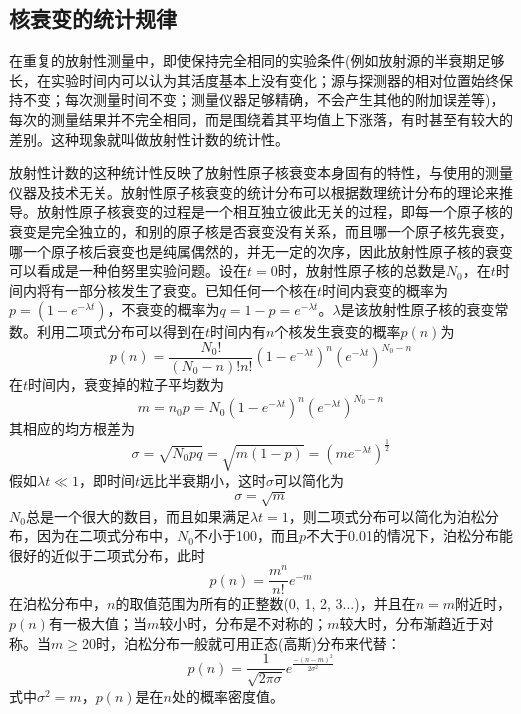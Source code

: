 \documentclass[a4paper]{article}
\begin{document}
\subsection{核衰变的统计规律}
在重复的放射性测量中，即使保持完全相同的实验条件(例如放射源的半衰期足够长，在实验时间内可以认为其活度基本上没有变化；源与探测器的相对位置始终保持不变；每次测量时间不变；测量仪器足够精确，不会产生其他的附加误差等)，每次的测量结果并不完全相同，而是围绕着其平均值上下涨落，有时甚至有较大的差别。这种现象就叫做放射性计数的统计性。

放射性计数的这种统计性反映了放射性原子核衰变本身固有的特性，与使用的测量仪器及技术无关。放射性原子核衰变的统计分布可以根据数理统计分布的理论来推导。放射性原子核衰变的过程是一个相互独立彼此无关的过程，即每一个原子核的衰变是完全独立的，和别的原子核是否衰变没有关系，而且哪一个原子核先衰变，哪一个原子核后衰变也是纯属偶然的，并无一定的次序，因此放射性原子核的衰变可以看成是一种伯努里实验问题。设在$t=0$时，放射性原子核的总数是$N_0$，在$t$时间内将有一部分核发生了衰变。已知任何一个核在$t$时间内衰变的概率为$p = (1-e^{-\lambda t})$，不衰变的概率为$q = 1 - p = e^{-\lambda t}$。$\lambda$是该放射性原子核的衰变常数。利用二项式分布可以得到在$t$时间内有$n$个核发生衰变的概率$p(n)$为
\begin{equation}
	p(n) = \frac{N_0!}{(N_0 - n)!n!}(1-e^{-\lambda t})^n(e^{-\lambda t})^{N_0 - n}\label{eq3}
\end{equation}
在$t$时间内，衰变掉的粒子平均数为
\begin{equation}
	m = n_0p = N_0(1-e^{-\lambda t})^n(e^{-\lambda t})^{N_0 - n}\label{eq4}
\end{equation}
其相应的均方根差为
\begin{equation}
	\sigma = \sqrt{N_0pq} = \sqrt{m(1-p)} = (me^{-\lambda t})^{\frac{1}{2}}\label{eq5}
\end{equation}
假如$\lambda t\ll 1$，即时间$t$远比半衰期小，这时$\sigma$可以简化为
\begin{equation}
	\sigma = \sqrt{m}\label{eq6}
\end{equation}
$N_0$总是一个很大的数目，而且如果满足$\lambda t=1$，则二项式分布可以简化为泊松分布，因为在二项式分布中，$N_0$不小于100，而且$p$不大于0.01的情况下，泊松分布能很好的近似于二项式分布，此时
\begin{equation}
	p(n) = \frac{m^n}{n!}e^{-m}\label{eq7}
\end{equation}
在泊松分布中，$n$的取值范围为所有的正整数(0, 1, 2, 3$\dots$)，并且在$n=m$附近时，$p(n)$有一极大值；当$m$较小时，分布是不对称的；$m$较大时，分布渐趋近于对称。当$m\geq 20$时，泊松分布一般就可用正态(高斯)分布来代替：
\begin{equation}
	p(n) = \frac{1}{\sqrt{2\pi\sigma}}e^{\frac{-(n-m)^2}{2\sigma^2}}\label{eq8}
\end{equation}
式中$\sigma^2=m$，$p(n)$是在$n$处的概率密度值。
\end{document}
